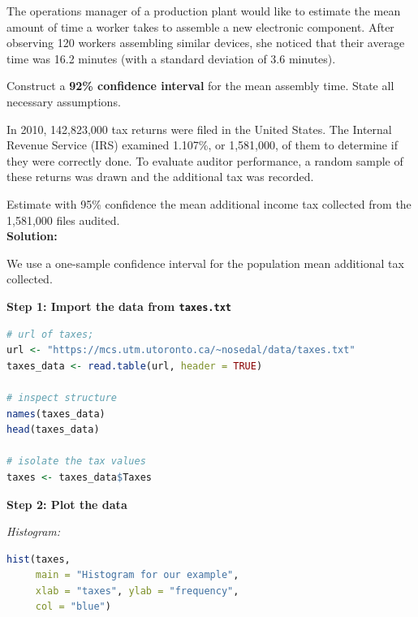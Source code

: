 \begin{example}

The operations manager of a production plant would like to estimate the mean amount of time a worker takes to assemble a new electronic component. After observing 120 workers assembling similar devices, she noticed that their average time was 16.2 minutes (with a standard deviation of 3.6 minutes).

Construct a \textbf{92\% confidence interval} for the mean assembly time. State all necessary assumptions.

\end{example}
\begin{example}

In 2010, 142,823,000 tax returns were filed in the United States. The Internal Revenue Service (IRS) examined 1.107\%, or 1,581,000, of them to determine if they were correctly done. To evaluate auditor performance, a random sample of these returns was drawn and the additional tax was recorded.

Estimate with 95\% confidence the mean additional income tax collected from the 1,581,000 files audited.\\



\textbf{Solution:}

We use a one-sample confidence interval for the population mean additional tax collected.

\textbf{Step 1: Import the data from \texttt{taxes.txt}}

\begin{lstlisting}[language=R]
# url of taxes;
url <- "https://mcs.utm.utoronto.ca/~nosedal/data/taxes.txt"
taxes_data <- read.table(url, header = TRUE)

# inspect structure
names(taxes_data)
head(taxes_data)

# isolate the tax values
taxes <- taxes_data$Taxes
\end{lstlisting}

\vspace{1em}
\textbf{Step 2: Plot the data}

\textit{Histogram:}

\begin{lstlisting}[language=R]
hist(taxes,
     main = "Histogram for our example",
     xlab = "taxes", ylab = "frequency",
     col = "blue")
\end{lstlisting}


\end{example}
